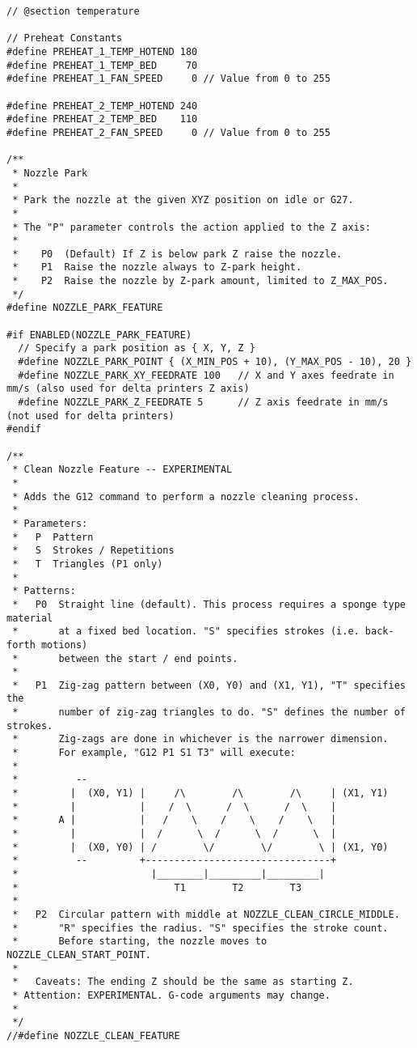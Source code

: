 \begin{lstlisting}[caption = キャプション, label = ラベル]
// @section temperature

// Preheat Constants
#define PREHEAT_1_TEMP_HOTEND 180
#define PREHEAT_1_TEMP_BED     70
#define PREHEAT_1_FAN_SPEED     0 // Value from 0 to 255

#define PREHEAT_2_TEMP_HOTEND 240
#define PREHEAT_2_TEMP_BED    110
#define PREHEAT_2_FAN_SPEED     0 // Value from 0 to 255

/**
 * Nozzle Park
 *
 * Park the nozzle at the given XYZ position on idle or G27.
 *
 * The "P" parameter controls the action applied to the Z axis:
 *
 *    P0  (Default) If Z is below park Z raise the nozzle.
 *    P1  Raise the nozzle always to Z-park height.
 *    P2  Raise the nozzle by Z-park amount, limited to Z_MAX_POS.
 */
#define NOZZLE_PARK_FEATURE

#if ENABLED(NOZZLE_PARK_FEATURE)
  // Specify a park position as { X, Y, Z }
  #define NOZZLE_PARK_POINT { (X_MIN_POS + 10), (Y_MAX_POS - 10), 20 }
  #define NOZZLE_PARK_XY_FEEDRATE 100   // X and Y axes feedrate in mm/s (also used for delta printers Z axis)
  #define NOZZLE_PARK_Z_FEEDRATE 5      // Z axis feedrate in mm/s (not used for delta printers)
#endif

/**
 * Clean Nozzle Feature -- EXPERIMENTAL
 *
 * Adds the G12 command to perform a nozzle cleaning process.
 *
 * Parameters:
 *   P  Pattern
 *   S  Strokes / Repetitions
 *   T  Triangles (P1 only)
 *
 * Patterns:
 *   P0  Straight line (default). This process requires a sponge type material
 *       at a fixed bed location. "S" specifies strokes (i.e. back-forth motions)
 *       between the start / end points.
 *
 *   P1  Zig-zag pattern between (X0, Y0) and (X1, Y1), "T" specifies the
 *       number of zig-zag triangles to do. "S" defines the number of strokes.
 *       Zig-zags are done in whichever is the narrower dimension.
 *       For example, "G12 P1 S1 T3" will execute:
 *
 *          --
 *         |  (X0, Y1) |     /\        /\        /\     | (X1, Y1)
 *         |           |    /  \      /  \      /  \    |
 *       A |           |   /    \    /    \    /    \   |
 *         |           |  /      \  /      \  /      \  |
 *         |  (X0, Y0) | /        \/        \/        \ | (X1, Y0)
 *          --         +--------------------------------+
 *                       |________|_________|_________|
 *                           T1        T2        T3
 *
 *   P2  Circular pattern with middle at NOZZLE_CLEAN_CIRCLE_MIDDLE.
 *       "R" specifies the radius. "S" specifies the stroke count.
 *       Before starting, the nozzle moves to NOZZLE_CLEAN_START_POINT.
 *
 *   Caveats: The ending Z should be the same as starting Z.
 * Attention: EXPERIMENTAL. G-code arguments may change.
 *
 */
//#define NOZZLE_CLEAN_FEATURE


\end{lstlisting}

